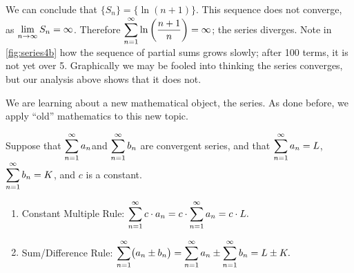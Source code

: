 \begin{example}
\begin{enumerate}
We can conclude that $\{S_n\} = \bigl\{\ln (n+1)\bigr\}$. This sequence  does not converge, as $\displaystyle \lim_{n\to\infty}S_n=\infty$. Therefore  $\displaystyle\sum_{n=1}^\infty  \ln\left(\frac{n+1}{n}\right)=\infty$; the series diverges. Note in \autoref{fig:series4b} how the sequence of partial sums grows slowly; after 100 terms, it is not yet over 5. Graphically we may be fooled into thinking the series converges, but our analysis above shows that it does not.
\end{enumerate}
\end{example}


We are learning about a new mathematical object, the series. As done before, we apply ``old'' mathematics to this new topic.

\begin{theorem}\label{thm:series_prop}%
Suppose that \quad$\displaystyle \sum_{n=1}^\infty a_n$\quad and \quad $\displaystyle\sum_{n=1}^\infty b_n$ are convergent series, and that \quad$\displaystyle \sum_{n=1}^\infty a_n = L$,\quad  $\displaystyle\sum_{n=1}^\infty b_n = K$, and $c$ is a constant.
\begin{enumerate}
\item  Constant Multiple Rule: $\displaystyle\sum_{n=1}^\infty c\cdot a_n = c\cdot\sum_{n=1}^\infty a_n = c\cdot L.$
\item		Sum/Difference Rule: $\displaystyle\sum_{n=1}^\infty \bigl(a_n\pm b_n\bigr) = \sum_{n=1}^\infty a_n \pm \sum_{n=1}^\infty b_n = L \pm K.$
\end{enumerate}
\end{theorem}

